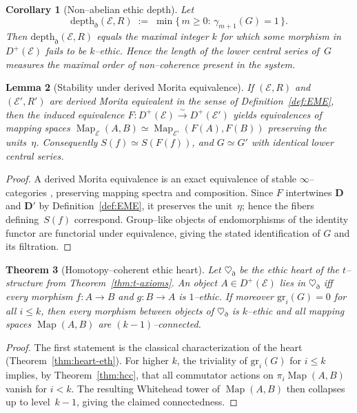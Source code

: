 \documentclass[12pt]{article}
\DeclareMathOperator{\Map}{Map}
\newcommand{\E}{\mathcal{E}}
\theoremstyle{plain}
\newtheorem{theorem}{Theorem}[section]
\newtheorem{lemma}[theorem]{Lemma}
\newtheorem{corollary}[theorem]{Corollary}
\theoremstyle{definition}
\theoremstyle{remark}
\numberwithin{equation}{section}
\begin{document}
\begin{corollary}[Non–abelian ethic depth]
Let
\[
\mathrm{depth}_\eth(\E,R)\;:=\;\min\{\,m\ge0:\,\gamma_{m+1}(G)=1\,\}.
\]
Then $\mathrm{depth}_\eth(\E,R)$ equals the maximal integer $k$ for which some morphism in $D^+(\E)$ fails to be $k$–ethic.  
Hence the length of the lower central series of~$G$ measures the maximal order of non–coherence present in the system.
\end{corollary}

\begin{lemma}[Stability under derived Morita equivalence]\label{lem:morita-hcc}
If $(\E,R)$ and $(\E',R')$ are derived Morita equivalent in the sense of Definition~\ref{def:EME}, then the induced equivalence $F:D^+(\E)\xrightarrow{\sim}D^+(\E')$ yields equivalences of mapping spaces $\Map_\E(A,B)\simeq \Map_{\E'}(F(A),F(B))$ preserving the units~$\eta$.  
Consequently $S(f)\simeq S(F(f))$, and $G\simeq G'$ with identical lower central series.
\end{lemma}

\begin{proof}
A derived Morita equivalence is an exact equivalence of stable $\infty$--categories \cite{LurieHA}, preserving mapping spectra and composition.  
Since $F$ intertwines $\mathbf D$ and $\mathbf D'$ by Definition~\ref{def:EME}, it preserves the unit~$\eta$; hence the fibers defining~$S(f)$ correspond.  
Group--like objects of endomorphisms of the identity functor are functorial under equivalence, giving the stated identification of $G$ and its filtration.
\end{proof}

\begin{theorem}[Homotopy--coherent ethic heart]\label{thm:homo-heart}
Let $\heartsuit_\eth$ be the ethic heart of the $t$--structure from Theorem~\ref{thm:t-axioms}.  
An object $A\in D^+(\E)$ lies in $\heartsuit_\eth$ iff every morphism $f:A\to B$ and $g:B\to A$ is $1$--ethic.  
If moreover $\mathrm{gr}_i(G)=0$ for all $i\le k$, then every morphism between objects of $\heartsuit_\eth$ is $k$--ethic and all mapping spaces $\Map(A,B)$ are $(k{-}1)$--connected.
\end{theorem}

\begin{proof}
The first statement is the classical characterization of the heart (Theorem~\ref{thm:heart-eth}).  
For higher $k$, the triviality of $\mathrm{gr}_i(G)$ for $i\le k$ implies, by Theorem~\ref{thm:hcc}, that all commutator actions on $\pi_i\Map(A,B)$ vanish for $i<k$.  
The resulting Whitehead tower of $\Map(A,B)$ then collapses up to level~$k{-}1$, giving the claimed connectedness.
\end{proof}
\end{document}
